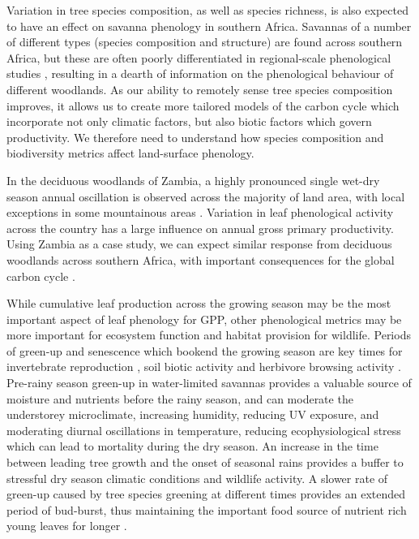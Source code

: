 \documentclass[11pt,a4paper]{article}
\begin{document}
Variation in tree species composition, as well as species richness, is also expected to have an effect on savanna phenology in southern Africa. Savannas of a number of different types (species composition and structure) are found across southern Africa, but these are often poorly differentiated in regional-scale phenological studies \citep{}, resulting in a dearth of information on the phenological behaviour of different woodlands. As our ability to remotely sense tree species composition improves, it allows us to create more tailored models of the carbon cycle which incorporate not only climatic factors, but also biotic factors which govern productivity. We therefore need to understand how species composition and biodiversity metrics affect land-surface phenology. 

In the deciduous woodlands of Zambia, a highly pronounced single wet-dry season annual oscillation is observed across the majority of land area, with local exceptions in some mountainous areas \citep{}. Variation in leaf phenological activity across the country has a large influence on annual gross primary productivity. Using Zambia as a case study, we can expect similar response from deciduous woodlands across southern Africa, with important consequences for the global carbon cycle \citep{}. 

While cumulative leaf production across the growing season may be the most important aspect of leaf phenology for GPP, other phenological metrics may be more important for ecosystem function and habitat provision for wildlife. Periods of green-up and senescence which bookend the growing season are key times for invertebrate reproduction \citep{}, soil biotic activity \citep{} and herbivore browsing activity \citep{}. Pre-rainy season green-up in water-limited savannas provides a valuable source of moisture and nutrients before the rainy season, and can moderate the understorey microclimate, increasing humidity, reducing UV exposure, and moderating diurnal oscillations in temperature, reducing ecophysiological stress which can lead to mortality during the dry season. An increase in the time between leading tree growth and the onset of seasonal rains provides a buffer to stressful dry season climatic conditions and wildlife activity. A slower rate of green-up caused by tree species greening at different times provides an extended period of bud-burst, thus maintaining the important food source of nutrient rich young leaves for longer \citep{}.
 
\end{document}
